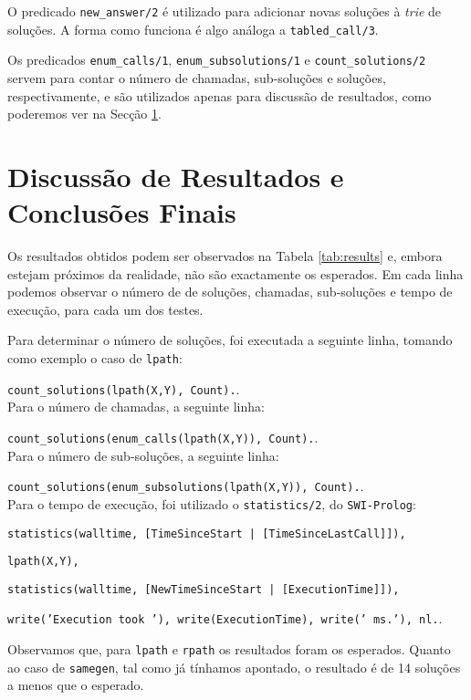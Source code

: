 \documentclass[12pt,a4paper,oneside]{article}
\begin{document}
O predicado \texttt{new\_answer/2} é utilizado para adicionar novas soluções à \textit{trie} de soluções. A forma como funciona é algo análoga a \texttt{tabled\_call/3}.

Os predicados \texttt{enum\_calls/1}, \texttt{enum\_subsolutions/1} e \texttt{count\_solutions/2} servem para contar o número de chamadas, sub-soluções e soluções, respectivamente, e são utilizados apenas para discussão de resultados, como poderemos ver na Secção \ref{sec:finit}.


\section{Discussão de Resultados e Conclusões Finais}\label{sec:finit}

Os resultados obtidos podem ser observados na Tabela \ref{tab:results} e, embora estejam próximos da realidade, não são exactamente os esperados. Em cada linha podemos observar o número de de soluções, chamadas, sub-soluções e tempo de execução, para cada um dos testes.

Para determinar o número de soluções, foi executada a seguinte linha, tomando como exemplo o caso de \texttt{lpath}:

\texttt{count\_solutions(lpath(X,Y), Count).}.\\

Para o número de chamadas, a seguinte linha:

\texttt{count\_solutions(enum\_calls(lpath(X,Y)), Count).}.\\

Para o número de sub-soluções, a seguinte linha:

\texttt{count\_solutions(enum\_subsolutions(lpath(X,Y)), Count).}.\\

Para o tempo de execução, foi utilizado o \texttt{statistics/2}, do \texttt{SWI-Prolog}:

\texttt{statistics(walltime, [TimeSinceStart | [TimeSinceLastCall]]),}

  \texttt{lpath(X,Y),}

  \texttt{statistics(walltime, [NewTimeSinceStart | [ExecutionTime]]),}

  \texttt{write('Execution took '), write(ExecutionTime), write(' ms.'), nl.}.

Observamos que, para \texttt{lpath} e \texttt{rpath} os resultados foram os esperados. Quanto ao caso de \texttt{samegen}, tal como já tínhamos apontado, o resultado é de 14 soluções a menos que o esperado.
\end{document}
